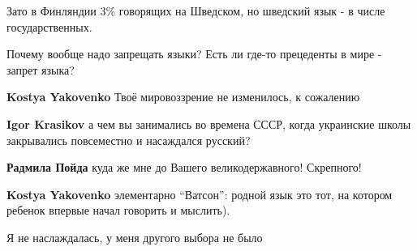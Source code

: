 \begin{itemize}
\begin{itemize}
Зато в Финляндии 3\% говорящих на Шведском, но шведский язык - в числе
государственных.

Почему вообще надо запрещать языки? Есть ли где-то прецеденты в мире - запрет
языка?

\textbf{Kostya Yakovenko} Твоё мировоззрение не изменилось, к сожалению

\textbf{Igor Krasikov} а чем вы занимались во времена СССР, когда украинские школы закрывались повсеместно и насаждался русский?

\textbf{Радмила Пойда} куда же мне до Вашего великодержавного! Скрепного!

\textbf{Kostya Yakovenko} элементарно \enquote{Ватсон}: родной язык это тот, на котором ребенок впервые начал говорить и мыслить).

Я не наслаждалась, у меня другого выбора не было

\end{itemize}

\end{itemize}

